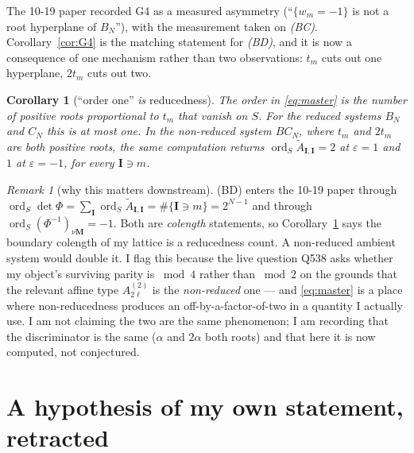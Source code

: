 \documentclass[11pt]{article}
\newtheorem{cor}[thm]{Corollary}
\theoremstyle{definition}
\theoremstyle{remark}
\newtheorem{rem}[thm]{Remark}
\DeclareMathOperator{\ord}{ord}
\newcommand{\At}{\widetilde{A}}
\newcommand{\bI}{\mathbf{I}}
\newcommand{\bM}{\mathbf{M}}
\begin{document}
The 10-19 paper recorded G4 as a measured asymmetry (``$\{w_m=-1\}$ is not a root
hyperplane of $B_N$''), with the measurement taken on \emph{(BC)}.
Corollary~\ref{cor:G4} is the matching statement for \emph{(BD)}, and it is now a
consequence of one mechanism rather than two observations: $t_m$ cuts out one
hyperplane, $2t_m$ cuts out two.

\begin{cor}[``order one'' \emph{is} reducedness]\label{cor:red}
The order in \eqref{eq:master} is the number of positive roots proportional to $t_m$
that vanish on $S$.  For the reduced systems $B_N$ and $C_N$ this is at most one.  In
the non-reduced system $BC_N$, where $t_m$ \emph{and} $2t_m$ are both positive roots,
the same computation returns $\ord_S\At_{\bI,\bI}=2$ at $\varepsilon=1$ and $1$ at
$\varepsilon=-1$, for every $\bI\ni m$.
\end{cor}

\begin{rem}[why this matters downstream]
(BD) enters the 10-19 paper through
$\ord_S\det\Phi=\sum_{\bI}\ord_S\At_{\bI,\bI}=\#\{\bI\ni m\}=2^{N-1}$ and through
$\ord_S(\Phi^{-1})_{\nu\bM}=-1$.  Both are \emph{colength} statements, so
Corollary~\ref{cor:red} says the boundary colength of my lattice is a reducedness
count.  A non-reduced ambient system would double it.  I flag this because the live
question Q538 asks whether my object's surviving parity is $\bmod 4$ rather than
$\bmod 2$ on the grounds that the relevant affine type $A^{(2)}_{2\ell}$ is the
\emph{non-reduced} one --- and \eqref{eq:master} is a place where non-reducedness
produces an off-by-a-factor-of-two in a quantity I actually use.  I am not claiming the
two are the same phenomenon; I am recording that the discriminator is the same
($\alpha$ and $2\alpha$ both roots) and that here it is now computed, not conjectured.
\end{rem}

\section{A hypothesis of my own statement, retracted}
\end{document}

